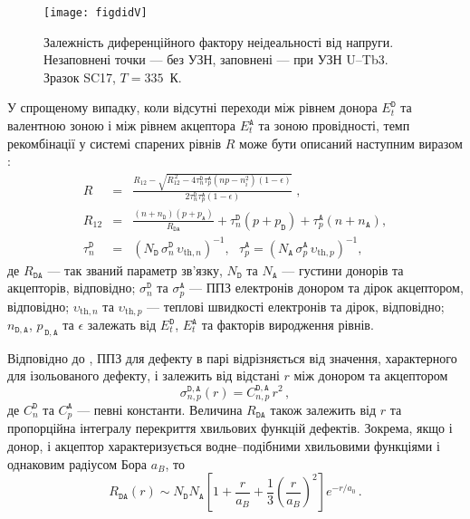 \begin{figure}
\center
\texttt{[image: figdidV]}%
\caption{\label{figdidV}
Залежність диференційного фактору неідеальності від напруги.
Незаповнені точки --- без УЗН, заповнені --- при УЗН U--Tb3.
Зразок SC17, $T=335$~К.
}%
\end{figure}

У спрощеному випадку, коли відсутні переходи між рівнем донора $E_t^{\mathtt{D}}$ та валентною зоною
і між рівнем акцептора $E_t^{\mathtt{A}}$ та зоною провідності,
темп рекомбінації у системі спарених рівнів $R$ може бути описаний наступним виразом \cite{CDLR:JAP1995}:
\begin{eqnarray}
R&=&\frac{R_{12}-\sqrt{R_{12}^{\,2}-4\tau_{n}^{\mathtt{D}}\tau_{p}^{\mathtt{A}}(np-n_i^2)(1-\epsilon)}}{2\tau_{n}^{\mathtt{D}}\tau_{p}^{\mathtt{A}}(1-\epsilon)}\;,\label{eqR}\\
R_{12}&=&\frac{(n+n_{\mathtt{D}})(p+p_{\mathtt{A}})}{R_{\mathtt{DA}}}+
\tau_{n}^{\mathtt{D}}(p+p_{\mathtt{D}})+\tau_{p}^{\mathtt{A}}(n+n_{\mathtt{A}}),\label{eqR12}\\
\tau_{n}^{\mathtt{D}}&=&(N_{\mathtt{D}}\,\sigma_{n}^{\mathtt{D}}\,\upsilon_{\mathrm{th},n})^{-1},\,\,\,\,
\tau_{p}^{\mathtt{A}}=(N_{\mathtt{A}}\,\sigma_{p}^{\mathtt{A}}\,\upsilon_{\mathrm{th},p})^{-1},\label{eqTAU}
\end{eqnarray}
де
$R_{\mathtt{DA}}$ --- так званий параметр зв'язку,
$N_{\mathtt{D}}$ та $N_{\mathtt{A}}$ --- густини донорів та акцепторів, відповідно;
$\sigma_{n}^{\mathtt{D}}$ та $\sigma_{p}^{\mathtt{A}}$ --- ППЗ електронів донором та дірок акцептором, відповідно;
$\upsilon_{\mathrm{th},n}$ та $\upsilon_{\mathrm{th},p}$ --- теплові швидкості електронів та дірок, відповідно;
$n_{\mathtt{D,A}}$, $p_{\,\mathtt{D,A}}$ та $\epsilon$ залежать від $E_t^{\mathtt{D}}$, $E_t^{\mathtt{A}}$ та факторів виродження рівнів.

Відповідно до \cite{CDLR:JAP},
ППЗ для дефекту в парі відрізняється від значення, характерного для ізольованого дефекту, і залежить від відстані $r$ між донором та акцептором
\begin{equation}
\label{eqSigma}
\sigma_{n,p}^{\mathtt{D,A}}(r)=C_{n,p}^{\mathtt{D,A}}\,r^2\,,
\end{equation}
де $C_{n}^{\mathtt{D}}$ та $C_{p}^{\mathtt{A}}$ --- певні константи.
Величина $R_{\mathtt{DA}}$ також залежить від $r$ та пропорційна інтегралу перекриття хвильових функцій дефектів.
Зокрема, якщо і донор, і акцептор характеризується водне--подібними хвильовими функціями і однаковим радіусом Бора $a_B$, то \cite{CDLR:JAP}
\begin{equation}
\label{eqRda}
R_{\mathtt{DA}} (r) \sim N_{\mathtt{D}}N_{\mathtt{A}}\left[1+\frac{r}{a_B}+\frac{1}{3}\left(\frac{r}{a_B}\right)^2\right]
   e^{-r/a_0}\,.
\end{equation}

